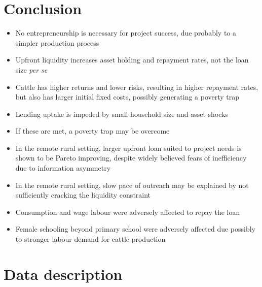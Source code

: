 \section{Conclusion}
\label{SecConclusion}

\begin{itemize}
\vspace{1.0ex}\setlength{\itemsep}{1.0ex}\setlength{\baselineskip}{12pt}
\item	No entrepreneurship is necessary for project success, due probably to a simpler production process
\item	Upfront liquidity increases asset holding and repayment rates, not the loan size \textit{per se}
\item	Cattle has higher returns and lower risks, resulting in higher repayment rates, but also has larger initial fixed costs, possibly generating a poverty trap
\item	Lending uptake is impeded by small household size and asset shocks
\item	If these are met, a poverty trap may be overcome
\item	In the remote rural setting, larger upfront loan suited to project needs is shown to be Pareto improving, despite widely believed fears of inefficiency due to information asymmetry
\item	In the remote rural setting, slow pace of outreach may be explained by not sufficiently cracking the liquidity constraint
\item	Consumption and wage labour were adversely affected to repay the loan
\item	Female schooling beyond primary school were adversely affected due possibly to stronger labour demand for cattle production
\end{itemize}

{\footnotesize
\setlength{\baselineskip}{8pt}

}

\appendix
\setcounter{section}{0}
\setcounter{figure}{0}
\setcounter{table}{0}
\renewcommand{\thefigure}{\Alph{section}\arabic{figure}}
\renewcommand{\thetable}{\Alph{section}\arabic{table}}
\renewcommand{\thesection}{\Alph{section}}



\section{Data description}

